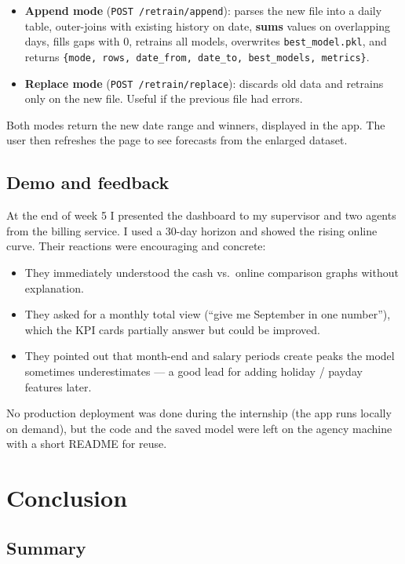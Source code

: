 \documentclass[12pt,a4paper]{report}
\begin{document}
\begin{itemize}
\item \textbf{Append mode} (\texttt{POST /retrain/append}): parses the new file into a daily table, outer-joins with existing history on date, \textbf{sums} values on overlapping days, fills gaps with 0, retrains all models, overwrites \texttt{best\_model.pkl}, and returns \texttt{\{mode, rows, date\_from, date\_to, best\_models, metrics\}}.
\item \textbf{Replace mode} (\texttt{POST /retrain/replace}): discards old data and retrains only on the new file. Useful if the previous file had errors.
\end{itemize}

Both modes return the new date range and winners, displayed in the app. The user then refreshes the page to see forecasts from the enlarged dataset.

\section{Demo and feedback}

At the end of week 5 I presented the dashboard to my supervisor and two agents from the billing service. I used a 30-day horizon and showed the rising online curve. Their reactions were encouraging and concrete:

\begin{itemize}
\item They immediately understood the cash vs.\ online comparison graphs without explanation.
\item They asked for a monthly total view (``give me September in one number''), which the KPI cards partially answer but could be improved.
\item They pointed out that month-end and salary periods create peaks the model sometimes underestimates --- a good lead for adding holiday / payday features later.
\end{itemize}

No production deployment was done during the internship (the app runs locally on demand), but the code and the saved model were left on the agency machine with a short README for reuse.

\chapter{Conclusion}

\section{Summary}
\end{document}
